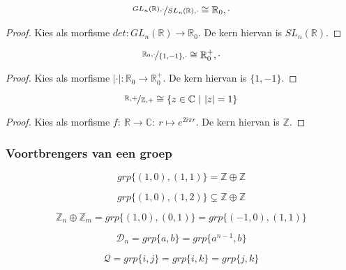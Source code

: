\documentclass[main.tex]{subfiles}
\begin{document}
\begin{vb}
  \[ \nicefrac{GL_{n}(\mathbb{R}),\cdot}{SL_{n}(\mathbb{R}),\cdot} \cong \mathbb{R}_{0},\cdot \]
  
  \begin{proof}
    Kies als morfisme $det: GL_{n}(\mathbb{R}) \rightarrow
    \mathbb{R}_{0}$.  De kern hiervan is $SL_{n}(\mathbb{R})$.
  \end{proof}
\end{vb}

\begin{vb}
  \[ \nicefrac{\mathbb{R}_{0},\cdot}{\{1,-1\},\cdot} \cong \mathbb{R}_{0}^{+},\cdot \]

  \begin{proof}
    Kies als morfisme $|\cdot|: \mathbb{R}_{0} \rightarrow \mathbb{R}_{0}^{+}$.
    De kern hiervan is $\{1,-1\}$.
  \end{proof}
\end{vb}

\begin{vb}
  \[ \nicefrac{\mathbb{R},+}{\mathbb{Z},+} \cong \{ z \in \mathbb{C} \ |\ |z| = 1 \} \]

  \begin{proof}
    Kies als morfisme $f:\ \mathbb{R} \rightarrow \mathbb{C}:\ r \mapsto e^{2i\pi r}$.
    De kern hiervan is $\mathbb{Z}$.
  \end{proof}
\end{vb}

\subsubsection{Voortbrengers van een groep}

\begin{vb}
  \[ grp\{ (1,0),(1,1) \} = \mathbb{Z}\oplus\mathbb{Z} \]
\end{vb}

\begin{vb}
  \[ grp\{ (1,0),(1,2) \} \subsetneq \mathbb{Z}\oplus\mathbb{Z} \]
\end{vb}

\begin{vb}
  \[ \mathbb{Z}_{n} \oplus \mathbb{Z}_{m} = grp\{(1,0),(0,1)\} = grp\{(-1,0),(1,1)\} \]
\end{vb}

\begin{vb}
  \[ \mathcal{D}_{n} = grp\{a,b\} = grp\{ a^{n-1},b \} \]
\end{vb}

\begin{vb}
  \[ \mathcal{Q} = grp\{ i,j\} = grp\{ i,k \} = grp\{ j,k\} \]
\end{vb}
\end{document}
